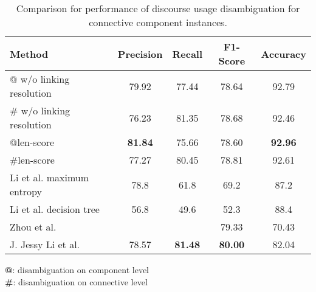 \begin{table}[ht]
\centering
\begin{tabular}{|l|c|c|c|c|}
\hline

    Method                    &     Precision &     Recall &     F1-Score &     Accuracy \\ \hline
    @ w/o linking resolution  &     79.92     &     77.44  &     78.64    &     92.79    \\ \hline
    \# w/o linking resolution &     76.23     &     81.35  &     78.68    &     92.46    \\ \hline
    @len-score                & \bf 81.84     &     75.66  &     78.60    & \bf 92.96    \\ \hline
    \#len-score               &     77.27     &     80.45  &     78.81    &     92.61    \\

\hhline{|=|=|=|=|=|}

    Li et al. maximum entropy &     78.8      &     61.8   &     69.2     &     87.2     \\ \hline
    Li et al. decision tree   &     56.8      &     49.6   &     52.3     &     88.4     \\

\hhline{|=|=|=|=|=|}

    Zhou et al.               &               &            &     79.33    &     70.43    \\ \hline
    J. Jessy Li et al.        &     78.57     & \bf 81.48  & \bf 80.00    &     82.04    \\ \hline

\end{tabular}
\begin{flushleft}
\small
\textbf{@}: disambiguation on component level \\
\textbf{\#}: disambiguation on connective level \\
\end{flushleft}
\caption{\label{t:recognition-methods} Comparison for performance of discourse usage
disambiguation for connective component instances. }
\end{table}
